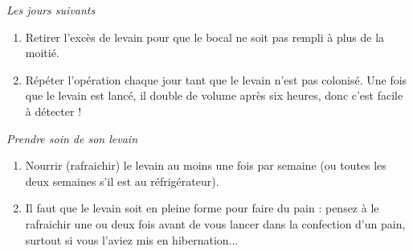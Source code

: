 \documentclass[9pt]{extarticle}
\begin{document}
\textit{Les jours suivants}
\begin{enumerate}[left=0pt,noitemsep]
    \item Retirer l'excès de levain pour que le bocal ne soit pas rempli à plus de la moitié.
    \item Répéter l'opération chaque jour tant que le levain n'est pas colonisé. Une fois que le levain est lancé, il double de volume après six heures, donc c'est facile à détecter !
\end{enumerate}

\textit{Prendre soin de son levain}
\begin{enumerate}[left=0pt,noitemsep]
    \item Nourrir (rafraichir) le levain au moins une fois par semaine (ou toutes les deux semaines s'il est au réfrigérateur).
    \item Il faut que le levain soit en pleine forme pour faire du pain : pensez à le rafraichir une ou deux fois avant de vous lancer dans la confection d'un pain, surtout si vous l'aviez mis en hibernation...
\end{enumerate}
\end{document}
